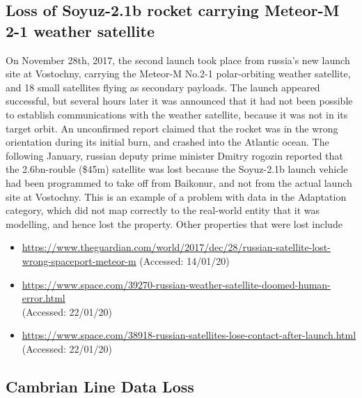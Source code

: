 \subsection{Loss of Soyuz-2.1b rocket carrying Meteor-M 2-1 weather satellite} \label{bkm:incacc:soyuz}
On November 28th, 2017, the second launch took place from russia's new launch site at Vostochny, carrying the Meteor-M No.2-1 polar-orbiting weather satellite, and 18 small satellites flying as secondary payloads. The launch appeared successful, but several hours later it was announced that it had not been possible to establish communications with the weather satellite, because it was not in its target orbit. An unconfirmed report claimed that the rocket was in the wrong orientation during its initial burn, and crashed into the Atlantic ocean.
The following January, russian deputy prime minister Dmitry rogozin reported that the 2.6bn-rouble (\$45m) satellite was lost because the Soyuz-2.1b launch vehicle had been programmed to take off from Baikonur, and not from the actual launch site at Vostochny. 
This is an example of a problem with data in the Adaptation category, which did not map correctly to the real-world entity that it was modelling, and hence lost the  property. Other properties that were lost include 

\begin{itemize}
  \item \raggedright{\href{https://www.theguardian.com/world/2017/dec/28/russian-satellite-lost-wrong-spaceport-meteor-m}{https://www.theguardian.com/world/2017/dec/28/russian-satellite-lost-wrong-spaceport-meteor-m} (Accessed: 14/01/20)}
  \item \raggedright{\href{https://www.space.com/39270-russian-weather-satellite-doomed-human-error.html}{https://www.space.com/39270-russian-weather-satellite-doomed-human-error.html} \\(Accessed: 22/01/20)}
  \item \raggedright{\href{https://www.space.com/38918-russian-satellites-lose-contact-after-launch.html}{https://www.space.com/38918-russian-satellites-lose-contact-after-launch.html} \\(Accessed: 22/01/20)}
\end{itemize}
%
%
\subsection{Cambrian Line Data Loss} \label{bkm:incacc:cambrian}

